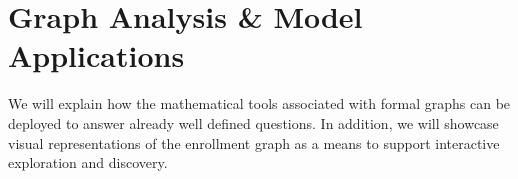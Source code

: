 \section{Graph Analysis \& Model Applications}
\label{sec:analysis}


We will explain how the mathematical tools associated with formal
graphs can be deployed to answer already well defined questions. In
addition, we will showcase visual representations of the enrollment
graph as a means to support interactive exploration and discovery.

